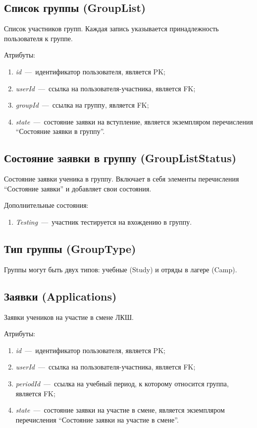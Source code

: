 \documentclass[14pt]{article}
\begin{document}
\subsection{Список группы (GroupList)}

Список участников групп. Каждая запись указывается принадлежность пользователя к группе.

Атрибуты:
\begin{enumerate}
	\item \emph{id}~---~идентификатор пользователя, является PK; 
	\item \emph{userId}~---~ссылка на пользователя-участника, является FK;
	\item \emph{groupId}~---~ссылка на группу, является FK;
	\item \emph{state}~---~состояние заявки на вступление, является экземпляром перечисления ``Состояние заявки в группу''.
\end{enumerate}

\subsection{Состояние заявки в группу (GroupListStatus)}

Состояние заявки ученика в группу. Включает в себя элементы перечисления ``Состояние заявки'' и добавляет свои состояния.

Дополнительные состояния:
\begin{enumerate}
	\item \emph{Testing}~---~участник тестируется на вхождению в группу.
\end{enumerate}

\subsection{Тип группы (GroupType)}

Группы могут быть двух типов: учебные (Study) и отряды в лагере (Camp).

\subsection{Заявки (Applications)}

Заявки учеников на участие в смене ЛКШ.

Атрибуты:
\begin{enumerate}
	\item \emph{id}~---~идентификатор пользователя, является PK; 
	\item \emph{userId}~---~ссылка на пользователя-участника, является FK;
	\item \emph{periodId}~---~ссылка на учебный период, к которому относится группа, является FK;
	\item \emph{state}~---~состояние заявки на участие в смене, является экземпляром перечисления ``Состояние заявки на участие в смене''. 
\end{enumerate}
\end{document}
